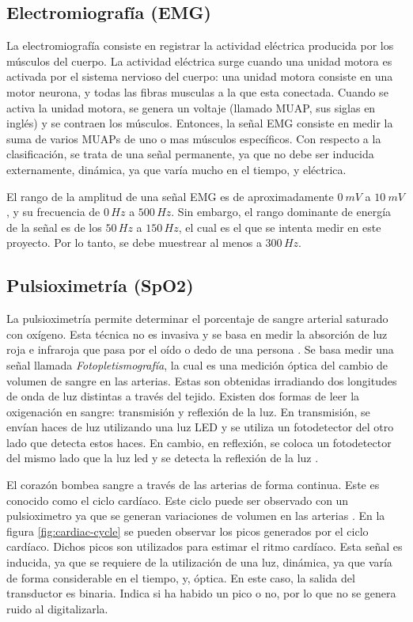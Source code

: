 \subsection{Electromiografía (EMG)}

La electromiografía consiste en registrar la actividad eléctrica producida por los músculos del cuerpo. La actividad eléctrica surge cuando una unidad motora es activada por el sistema nervioso del cuerpo: una unidad motora consiste en una motor neurona, y todas las fibras musculas a la que esta conectada.  Cuando se activa la unidad motora, se genera un voltaje (llamado MUAP, sus siglas en inglés) y se contraen los músculos.  Entonces, la señal EMG consiste en medir la suma de varios MUAPs de uno o mas músculos específicos. Con respecto a la clasificación, se trata de una señal permanente, ya que no debe ser inducida externamente, dinámica, ya que varía mucho en el tiempo, y eléctrica.

El rango de la amplitud de una señal EMG es de aproximadamente $0\ mV$ a $10\ mV$, y su frecuencia de $0\, Hz$ a $500\, Hz$.  Sin embargo, el rango dominante de energía de la señal es de los $50\, Hz$ a $150\, Hz$, el cual es el que se intenta medir en este proyecto. Por lo tanto, se debe muestrear al menos a $300 \, Hz$.

\subsection{Pulsioximetría (SpO2)}

La pulsioximetría permite determinar el porcentaje de sangre arterial saturado con oxígeno. Esta técnica no es invasiva y se basa en medir la absorción de luz roja e infraroja que pasa por el oído o dedo de una persona \cite{spo2-1}. Se basa medir una señal llamada \emph{Fotopletismografía}, la cual es una medición óptica del cambio de volumen de sangre en las arterias. Estas son obtenidas irradiando dos longitudes de onda de luz distintas a través del tejido. Existen dos formas de leer la oxigenación en sangre: transmisión y reflexión de la luz. En transmisión, se envían haces de luz utilizando una luz LED y se utiliza un fotodetector del otro lado que detecta estos haces. En cambio, en reflexión, se coloca un fotodetector del mismo lado que la luz led y se detecta la reflexión de la luz \cite{spo2-2}.  

El corazón bombea sangre a través de las arterias de forma continua. Este es conocido como el ciclo cardíaco. Este ciclo puede ser observado con un pulsioximetro ya que se generan variaciones de volumen en las arterias \cite{spo2-2}. En la figura \ref{fig:cardiac-cycle} se pueden observar los picos generados por el ciclo cardíaco. Dichos picos son utilizados para estimar el ritmo cardíaco. Esta señal es inducida, ya que se requiere de la utilización de una luz, dinámica, ya que varía de forma considerable en el tiempo, y, óptica. En este caso, la salida del transductor es binaria. Indica si ha habido un pico o no, por lo que no se genera ruido al digitalizarla.

